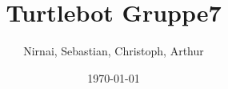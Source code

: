 %
% 
% 
%






\newcommand{\Datum}{\today}

\renewcommand{\PraesentationFusszeileZusatz}{}

\title{Turtlebot Gruppe7}
\author{Nirnai, Sebastian, Christoph, Arthur}
\institute[]{\UniversitaetName \\ \FakultaetName \\ \LehrstuhlName}
\date[\Datum]{\Datum}
\subject{}










\PraesentationMasterKopfzeileDreizeiler


